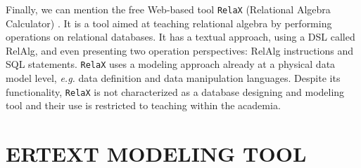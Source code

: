 \documentclass[a4paper,twoside,anonymous]{article}
\begin{document}
Finally, we can mention the free Web-based tool \texttt{RelaX}
(Relational Algebra Calculator) \cite{Kessler:2019}.
It is a tool aimed at teaching relational algebra by performing operations on relational databases.
It has a textual approach, using a DSL called RelAlg, and even presenting two operation perspectives: RelAlg instructions and SQL statements.
\texttt{RelaX} uses a modeling approach already at a physical data model level, \textit{e.g.} data definition and data manipulation languages.
Despite its functionality, \texttt{RelaX} is not characterized as a database designing and modeling tool and their use is restricted to teaching within the academia.

\section{\uppercase{ERtext Modeling Tool}} 
\label{sec:tool}



\end{document}
